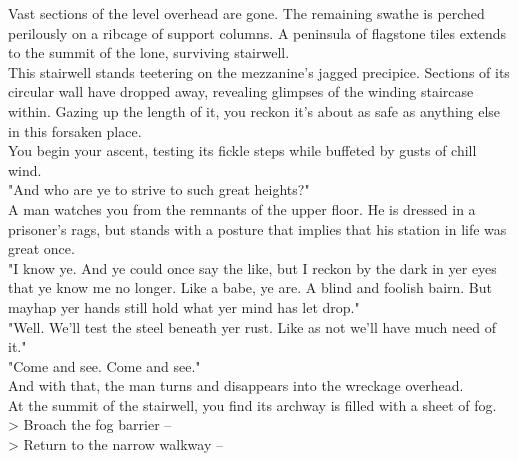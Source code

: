 Vast sections of the level overhead are gone. The remaining swathe is perched perilously on a ribcage of support columns. A peninsula of flagstone tiles extends to the summit of the lone, surviving stairwell.\\

This stairwell stands teetering on the mezzanine's jagged precipice. Sections of its circular wall have dropped away, revealing glimpses of the winding staircase within. Gazing up the length of it, you reckon it's about as safe as anything else in this forsaken place.\\

You begin your ascent, testing its fickle steps while buffeted by gusts of chill wind.\\

"And who are ye to strive to such great heights?"\\

A man watches you from the remnants of the upper floor. He is dressed in a prisoner's rags, but stands with a posture that implies that his station in life was great once.\\

"I know ye. And ye could once say the like, but I reckon by the dark in yer eyes that ye know me no longer. Like a babe, ye are. A blind and foolish bairn. But mayhap yer hands still hold what yer mind has let drop."\\

"Well. We'll test the steel beneath yer rust. Like as not we'll have much need of it."\\

"Come and see. Come and see."\\

And with that, the man turns and disappears into the wreckage overhead.\\

At the summit of the stairwell, you find its archway is filled with a sheet of fog.\\

> Broach the fog barrier -- \\
> Return to the narrow walkway -- 